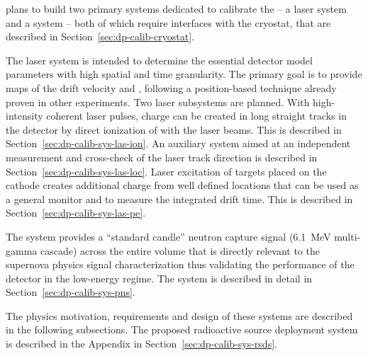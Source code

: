  plans to build two primary systems dedicated to calibrate the  -- a laser system
and a  system -- both of which require interfaces with the cryostat, that are described in Section~\ref{sec:dp-calib-cryostat}.

The laser system is intended to determine the essential detector model parameters with high spatial and time granularity. The primary goal is to provide maps of the drift velocity and \efield, following a position-based technique already proven in other  experiments. Two laser subsystems are planned. With high-intensity coherent laser pulses, charge can be created in long straight tracks in the detector by direct ionization of  with the laser beams. This is described in Section~\ref{sec:dp-calib-sys-las-ion}. An auxiliary system aimed at an independent measurement and cross-check of the laser track direction is described in Section~\ref{sec:dp-calib-sys-las-loc}. 
Laser excitation of targets placed on the cathode creates additional charge from well defined locations that can be used 
as a general  monitor and to measure the integrated drift time. This is described in Section~\ref{sec:dp-calib-sys-las-pe}. 

The  system provides a ``standard candle'' neutron capture signal (\SI{6.1}{\MeV} multi-gamma cascade) across the entire   volume that is directly relevant to the supernova physics signal characterization thus validating the performance of the detector in the low-energy regime. The  system is described in detail in Section~\ref{sec:dp-calib-sys-pns}.  

The physics motivation, requirements and design of these systems are described in the following subsections. The proposed radioactive source deployment system is described in the Appendix in Section~\ref{sec:dp-calib-sys-rsds}. 

